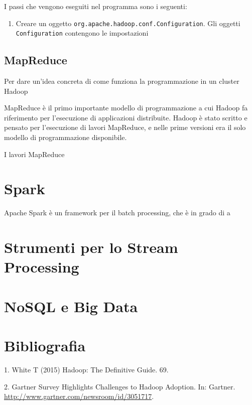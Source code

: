 \documentclass[italian,a4paper, twoside, 12pt]{report}
\providecommand{\tightlist}{%
  \setlength{\itemsep}{0pt}\setlength{\parskip}{0pt}}
\begin{document}
I passi che vengono eseguiti nel programma sono i seguenti:

\begin{enumerate}
\tightlist
\item
  Creare un oggetto \texttt{org.apache.hadoop.conf.Configuration}. Gli
  oggetti \texttt{Configuration} contengono le impostazioni
\end{enumerate}

\section{MapReduce}\label{mapreduce}

Per dare un'idea concreta di come funziona la programmazione in un
cluster Hadoop

MapReduce è il primo importante modello di programmazione a cui Hadoop
fa riferimento per l'esecuzione di applicazioni distribuite. Hadoop è
stato scritto e pensato per l'esecuzione di lavori MapReduce, e nelle
prime versioni era il solo modello di programmazione disponibile.

I lavori MapReduce

\chapter{Spark}\label{spark}

Apache Spark è un framework per il batch processing, che è in grado di a

\chapter{Strumenti per lo Stream
Processing}\label{strumenti-per-lo-stream-processing}

\chapter{NoSQL e Big Data}\label{nosql-e-big-data}

\chapter*{Bibliografia}\label{bibliografia}

\hypertarget{refs}{}
\hypertarget{ref-hadoop-guide-hdfs-file-read}{}
1. White T (2015) Hadoop: The Definitive Guide. 69.

\hypertarget{ref-hadoop-adoption-survey}{}
2. Gartner Survey Highlights Challenges to Hadoop Adoption. In: Gartner.
\url{http://www.gartner.com/newsroom/id/3051717}.
\end{document}
